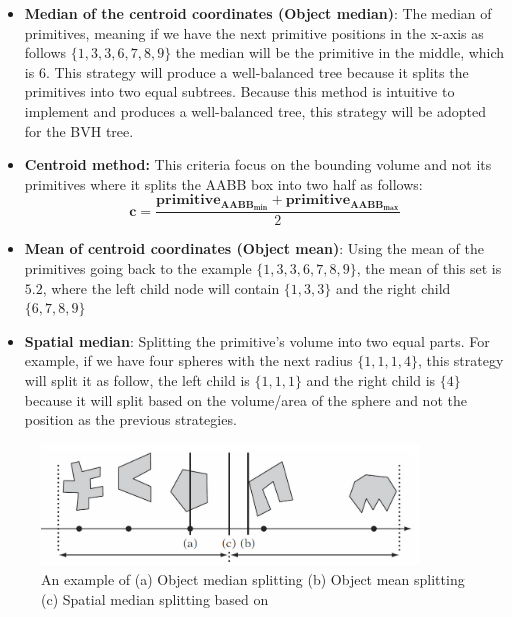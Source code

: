 \documentclass[11pt,a4paper]{article}
\begin{document}
\begin{itemize}
\item \textbf{Median of the centroid coordinates (Object median)}: The median of primitives, meaning if we have the next primitive positions in the x-axis as follows $\{1, 3, 3, 6, 7, 8, 9\}$ the median will be the primitive in the middle, which is $6$. This strategy will produce a well-balanced tree because it splits the primitives into two equal subtrees. Because this method is intuitive to implement and produces a well-balanced tree, this strategy will be adopted for the BVH tree. 

\item \textbf{Centroid method:}
This criteria focus on the bounding volume and not its primitives where it splits the AABB box into two half as follows:
\begin{equation}
\boldsymbol{c} = \frac{\boldsymbol{primitive_{AABB_{min}}}+\boldsymbol{primitive_{AABB_{max}}}}{2}
\end{equation}

\item  \textbf{Mean of centroid coordinates (Object mean)}: Using the mean of the primitives going back to the example $\{1, 3, 3, 6, 7, 8, 9\}$, the mean of this set is $5.2$, where the left child node will contain $\{1,3,3\}$ and the right child $\{6,7,8,9\}$

\item  \textbf{Spatial median}: Splitting the primitive's volume into two equal parts. For example, if we have four spheres with the next radius $\{1,1,1,4\}$, this strategy will split it as follow, the left child is $\{1,1,1\}$ and the right child is $\{4\}$ because it will split based on the volume/area of the sphere and not the position as the previous strategies. 


\end{itemize}


\begin{figure}[H]	
     \centering
     \captionsetup{justification=centering,margin=2cm}
     \includegraphics[width=10cm]{images/bvh_split.png}
     \caption{An example of (a) Object median splitting (b) Object mean splitting (c) Spatial median
splitting based on \protect\cite{Ericson2004}}
        \label{fig:dice}
\end{figure}
\end{document}
